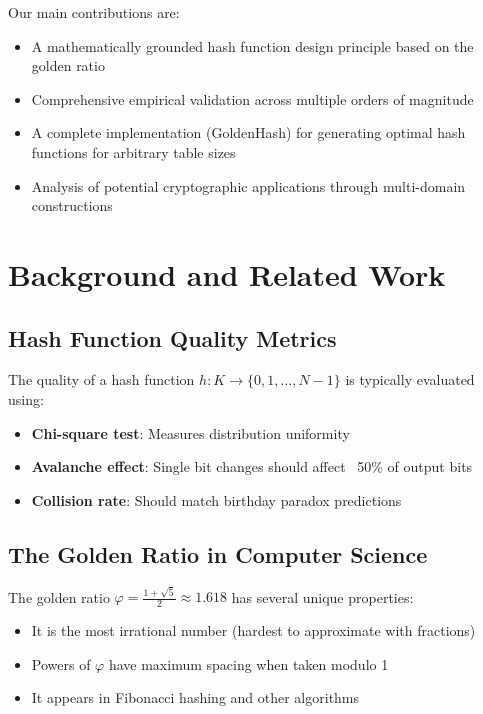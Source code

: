 \documentclass[11pt,a4paper]{article}
\theoremstyle{definition}
\begin{document}
Our main contributions are:
\begin{itemize}
\item A mathematically grounded hash function design principle based on the golden ratio
\item Comprehensive empirical validation across multiple orders of magnitude
\item A complete implementation (GoldenHash) for generating optimal hash functions for arbitrary table sizes
\item Analysis of potential cryptographic applications through multi-domain constructions
\end{itemize}

\section{Background and Related Work}

\subsection{Hash Function Quality Metrics}

The quality of a hash function $h: K \rightarrow \{0, 1, \ldots, N-1\}$ is typically evaluated using:

\begin{itemize}
\item \textbf{Chi-square test}: Measures distribution uniformity
\item \textbf{Avalanche effect}: Single bit changes should affect ~50\% of output bits
\item \textbf{Collision rate}: Should match birthday paradox predictions
\end{itemize}

\subsection{The Golden Ratio in Computer Science}

The golden ratio $\varphi = \frac{1 + \sqrt{5}}{2} \approx 1.618$ has several unique properties:
\begin{itemize}
\item It is the most irrational number (hardest to approximate with fractions)
\item Powers of $\varphi$ have maximum spacing when taken modulo 1
\item It appears in Fibonacci hashing and other algorithms
\end{itemize}
\end{document}
